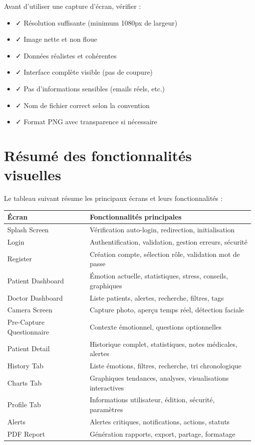 \documentclass[a4paper,11pt]{report}
\begin{document}
Avant d'utiliser une capture d'écran, vérifier :

\begin{itemize}
    \item ✓ Résolution suffisante (minimum 1080px de largeur)
    \item ✓ Image nette et non floue
    \item ✓ Données réalistes et cohérentes
    \item ✓ Interface complète visible (pas de coupure)
    \item ✓ Pas d'informations sensibles (emails réels, etc.)
    \item ✓ Nom de fichier correct selon la convention
    \item ✓ Format PNG avec transparence si nécessaire
\end{itemize}

\section{Résumé des fonctionnalités visuelles}

Le tableau suivant résume les principaux écrans et leurs fonctionnalités :

\begin{longtable}{|p{}|p{}|}
    \hline
    \textbf{Écran} & \textbf{Fonctionnalités principales} \\ \hline
    \endhead
    
    Splash Screen & Vérification auto-login, redirection, initialisation \\ \hline
    Login & Authentification, validation, gestion erreurs, sécurité \\ \hline
    Register & Création compte, sélection rôle, validation mot de passe \\ \hline
    Patient Dashboard & Émotion actuelle, statistiques, stress, conseils, graphiques \\ \hline
    Doctor Dashboard & Liste patients, alertes, recherche, filtres, tags \\ \hline
    Camera Screen & Capture photo, aperçu temps réel, détection faciale \\ \hline
    Pre-Capture Questionnaire & Contexte émotionnel, questions optionnelles \\ \hline
    Patient Detail & Historique complet, statistiques, notes médicales, alertes \\ \hline
    History Tab & Liste émotions, filtres, recherche, tri chronologique \\ \hline
    Charts Tab & Graphiques tendances, analyses, visualisations interactives \\ \hline
    Profile Tab & Informations utilisateur, édition, sécurité, paramètres \\ \hline
    Alerts & Alertes critiques, notifications, actions, statuts \\ \hline
    PDF Report & Génération rapports, export, partage, formatage \\ \hline
\end{longtable}
\end{document}
